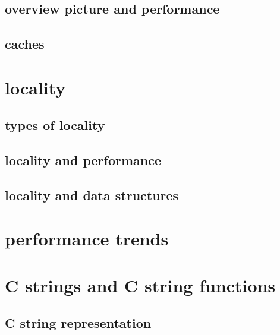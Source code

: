 \subsection{overview picture and performance}



\subsection{caches}



\section{locality}

\subsection{types of locality}



\subsection{locality and performance}



\subsection{locality and data structures}



\section{performance trends}



\section{C strings and C string functions}

\subsection{C string representation}





